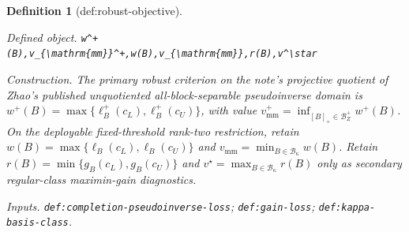 \documentclass{article}
\newtheorem{definition}{Definition}
\begin{document}
\begin{definition}[def:robust-objective]\label{def:robust-objective}
\par\smallskip\noindent\emph{Defined object.} \texttt{w\textasciicircum{}+\allowbreak{}(B),\allowbreak{}v\_\allowbreak{}\{\textbackslash{}\allowbreak{}mathrm\{mm\}\allowbreak{}\}\allowbreak{}\textasciicircum{}+\allowbreak{},\allowbreak{}w(B),\allowbreak{}v\_\allowbreak{}\{\textbackslash{}\allowbreak{}mathrm\{mm\}\allowbreak{}\}\allowbreak{},\allowbreak{}r(B),\allowbreak{}v\textasciicircum{}\textbackslash{}\allowbreak{}star}
\par\smallskip\noindent\emph{Construction.} The primary robust criterion on the note's projective quotient of Zhao's published unquotiented all-block-separable pseudoinverse domain is \(w^+(B)=\max\{\ell_B^+(c_L),\ell_B^+(c_U)\}\), with value \(v_{\mathrm{mm}}^+=\inf_{[B]_+\in\mathcal B_Z^+}w^+(B)\).  On the deployable fixed-threshold rank-two restriction, retain \(w(B)=\max\{\ell_B(c_L),\ell_B(c_U)\}\) and \(v_{\mathrm{mm}}=\min_{B\in\mathcal B_\kappa}w(B)\).  Retain \(r(B)=\min\{g_B(c_L),g_B(c_U)\}\) and \(v^\star=\max_{B\in\mathcal B_\kappa}r(B)\) only as secondary regular-class maximin-gain diagnostics.
\par\smallskip\noindent\emph{Inputs.} \texttt{def:\allowbreak{}completion-\allowbreak{}pseudoinverse-\allowbreak{}loss}; \texttt{def:\allowbreak{}gain-\allowbreak{}loss}; \texttt{def:\allowbreak{}kappa-\allowbreak{}basis-\allowbreak{}class}.
\end{definition}
\end{document}

